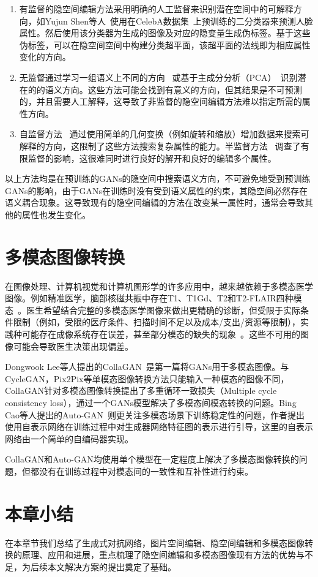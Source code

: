 \begin{enumerate}
\item 有监督的隐空间编辑方法采用明确的人工监督来识别潜在空间中的可解释方向，如Yujun Shen等人~\cite{interfacegan}使用在CelebA数据集~\cite{celeba}上预训练的二分类器来预测人脸属性。然后使用该分类器为生成的图像及对应的隐变量生成伪标签。基于这些伪标签，可以在隐空间空间中构建分类超平面，该超平面的法线即为相应属性变化的方向。

\item 无监督通过学习一组语义上不同的方向~\cite{icml2020} 或基于主成分分析（PCA）~\cite{harkonen2020ganspace}识别潜在的的语义方向。这些方法可能会找到有意义的方向，但其结果是不可预测的，并且需要人工解释，这导致了非监督的隐空间编辑方法难以指定所需的属性方向。

\item 自监督方法~\cite{steer,variation} 通过使用简单的几何变换（例如旋转和缩放）增加数据来搜索可解释的方向，这限制了这些方法搜索复杂属性的能力。半监督方法~\cite{nie2020semi} 调查了有限监督的影响，这很难同时进行良好的解开和良好的编辑多个属性。
\end{enumerate}

以上方法均是在预训练的GANs的隐空间中搜索语义方向，不可避免地受到预训练GANs的影响，由于GANs在训练时没有受到语义属性的约束，其隐空间必然存在语义耦合现象。这导致现有的隐空间编辑的方法在改变某一属性时，通常会导致其他的属性也发生变化。    

\section{多模态图像转换}

在图像处理、计算机视觉和计算机图形学的许多应用中，越来越依赖于多模态医学图像。例如精准医学，脑部核磁共振中存在T1、T1Gd、T2和T2-FLAIR四种模态~\cite{drevelegas2011imaging}。医生希望结合完整的多模态医学图像来做出更精确的诊断，但受限于实际条件限制（例如，受限的医疗条件、扫描时间不足以及成本/支出/资源等限制），实践种可能存在成像系统存在误差，甚至部分模态的缺失的现象~\cite{tanenbaum2017synthetic}。这些不可用的图像可能会导致医生决策出现偏差。

Dongwook Lee等人提出的CollaGAN~\cite{collagan}是第一篇将GANs用于多模态图像。与CycleGAN，Pix2Pix等单模态图像转换方法只能输入一种模态的图像不同，CollaGAN针对多模态图像转换提出了多重循环一致损失（Multiple cycle consistency loss），通过一个GANs模型解决了多模态间模态转换的问题。Bing Cao等人提出的Auto-GAN~\cite{AutoGAN}则更关注多模态场景下训练稳定性的问题，作者提出使用自表示网络在训练过程中对生成器网络特征图的表示进行引导，这里的自表示网络由一个简单的自编码器实现。

CollaGAN和Auto-GAN均使用单个模型在一定程度上解决了多模态图像转换的问题，但都没有在训练过程中对模态间的一致性和互补性进行约束。

\section{本章小结}

在本章节我们总结了生成式对抗网络，图片空间编辑、隐空间编辑和多模态图像转换的原理、应用和进展，重点梳理了隐空间编辑和多模态图像现有方法的优势与不足，为后续本文解决方案的提出奠定了基础。
